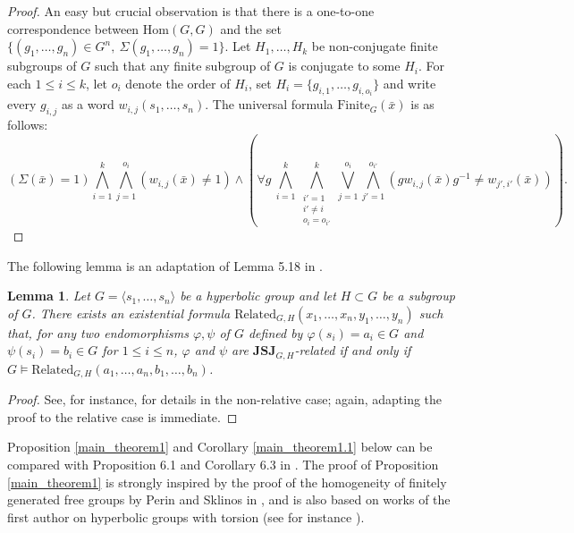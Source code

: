 \documentclass[a4paper, 11pt]{amsart}
\newtheorem{lemme}[te]{Lemma}
\theoremstyle{definition}
\theoremstyle{remark}
\renewcommand{\leq}{\leqslant}
\begin{document}
\begin{proof}An easy but crucial observation is that there is a one-to-one correspondence between $\mathrm{Hom}(G,G)$ and the set $\lbrace (g_1,\ldots,g_n)\in G^n, \ \Sigma(g_1,\ldots,g_n)=1\rbrace$. Let $H_1,\ldots, H_k$ be non-conjugate finite subgroups of $G$ such that any finite subgroup of $G$ is conjugate to some $H_i$. For each $1\leq i\leq k$, let $o_i$ denote the order of $H_i$, set $H_i=\lbrace g_{i,1},\ldots,g_{i,o_i}\rbrace $ and write every $g_{i,j}$ as a word $w_{i,j}(s_1,\ldots,s_n)$. The universal formula $\mathrm{Finite}_G(\bar{x})$ is as follows:\[(\Sigma(\bar{x})=1) \bigwedge_{i=1}^k\bigwedge_{j=1}^{o_i}(w_{i,j}(\bar{x})\neq 1) \wedge \left( \forall g \  \bigwedge_{i=1}^k\bigwedge_{\substack{i'=1\\ i'\neq i \\ o_i=o_{i'}}}^k\bigvee_{j=1}^{o_i}\bigwedge_{j'=1}^{o_{i'}} (gw_{i,j}(\bar{x})g^{-1}\neq w_{j',i'}(\bar{x}))\right).\]\end{proof}

The following lemma is an adaptation of Lemma 5.18 in \cite{Per11}.

\begin{lemme}\label{formula_related}Let $G=\langle s_1,\ldots,s_n \rangle$ be a hyperbolic group and let $H\subset G$ be a subgroup of $G$. There exists an existential formula $\mathrm{Related}_{G,H}(x_1,\ldots,x_n,y_1,\ldots,y_n)$ such that, for any two endomorphisms $\varphi, \psi$ of $G$ defined by $\varphi(s_i)=a_i\in G$ and $\psi(s_i)=b_i\in G$ for $1\leq i\leq n$, $\varphi$ and $\psi$ are $\mathbf{JSJ}_{G,H}$-related if and only if $G\models \mathrm{Related}_{G,H}(a_1,\ldots,a_n,b_1,\ldots,b_n)$.\end{lemme}

\begin{proof}See, for instance, \cite{And18} for details in the non-relative case; again, adapting the proof to the relative case is immediate.\end{proof}

Proposition \ref{main_theorem1} and Corollary \ref{main_theorem1.1} below can be compared with Proposition 6.1 and Corollary 6.3 in \cite{AP24}. The proof of Proposition \ref{main_theorem1} is strongly inspired by the proof of the homogeneity of finitely generated free groups by Perin and Sklinos in \cite{PS12}, and is also based on works of the first author on hyperbolic groups with torsion (see for instance \cite{And20}).
\end{document}
